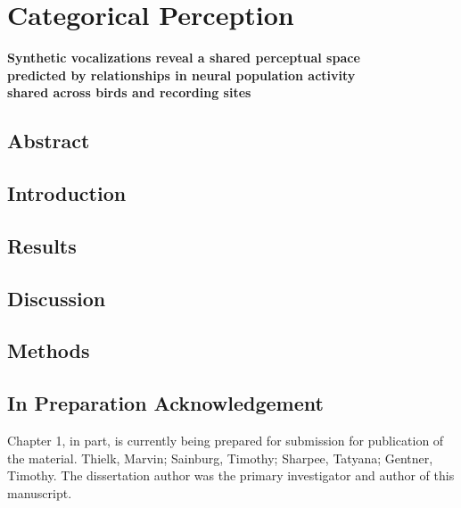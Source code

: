 \chapter{Categorical Perception}
\begin{flushright}
\textbf{\large Synthetic vocalizations reveal a shared perceptual space\\ predicted by relationships in neural population activity\\ shared across birds and recording sites}
\end{flushright}

\section{Abstract}


\section{Introduction}


\section{Results}


\section{Discussion}


\section{Methods}


\section{In Preparation Acknowledgement}
Chapter 1, in part, is currently being prepared for submission for publication of the material. Thielk, Marvin; Sainburg, Timothy; Sharpee, Tatyana; Gentner, Timothy. The dissertation author was the primary investigator and author of this manuscript.


\renewcommand{\figurename}{Supplementary Figure}

\renewcommand{\figurename}{Figure}
